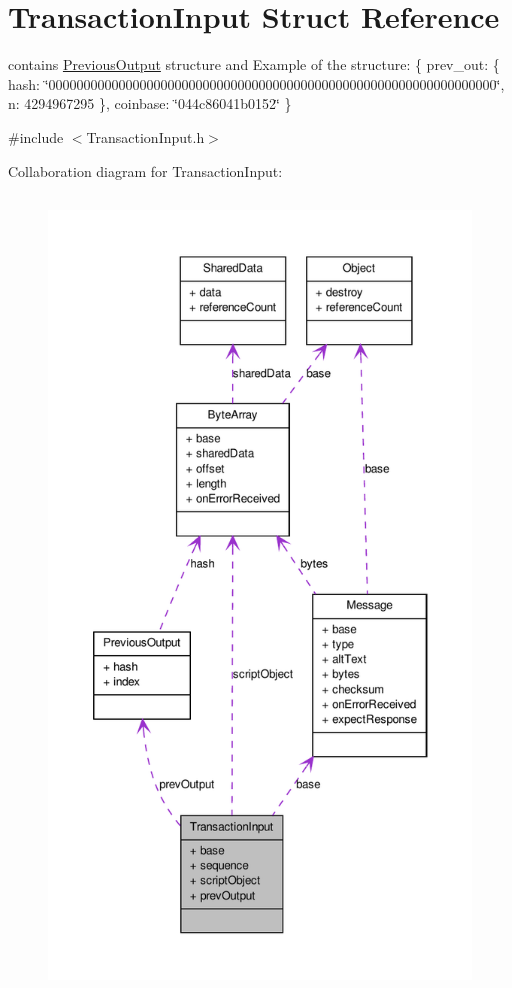 \hypertarget{struct_transaction_input}{
\section{TransactionInput Struct Reference}
\label{struct_transaction_input}
}


contains \hyperlink{struct_previous_output}{PreviousOutput} structure and Example of the structure: \{ prev\_\-out: \{ hash: \char`\"{}0000000000000000000000000000000000000000000000000000000000000000\char`\"{}, n: 4294967295 \}, coinbase: \char`\"{}044c86041b0152\char`\"{} \}  




{\ttfamily \#include $<$TransactionInput.h$>$}



Collaboration diagram for TransactionInput:\nopagebreak
\begin{figure}[H]
\begin{center}
\leavevmode
\includegraphics[height=600pt]{struct_transaction_input__coll__graph}
\end{center}
\end{figure}
